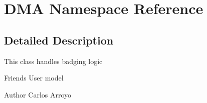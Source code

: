 \hypertarget{namespaceDMA}{\section{D\+M\+A Namespace Reference}
\label{namespaceDMA}
}


\subsection{Detailed Description}
This class handles badging logic

Friends User model  \begin{DoxyAuthor}{Author}
Carlos Arroyo 
\end{DoxyAuthor}
